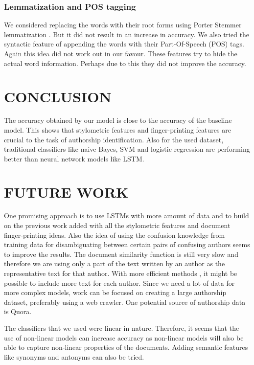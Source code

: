 \documentclass[letterpaper]{article}
\begin{document}
\subsubsection{Lemmatization and POS tagging}
We considered replacing the words with their root forms using Porter Stemmer lemmatization \cite{stem}. But it did not result in an increase in accuracy. We also tried the syntactic feature of appending the words with their Part-Of-Speech (POS) tags. Again this idea did not work out in our favour. These features try to hide the actual word information. Perhaps due to this they did not improve the accuracy.

\section{CONCLUSION}
The accuracy obtained by our model is close to the accuracy of the baseline model. This shows that stylometric features and finger-printing features are crucial to the task of authorship identification. Also for the used dataset, traditional classifiers like naive Bayes, SVM and logistic regression are performing better than neural network models like LSTM.

\section{FUTURE WORK}
One promising approach is to use LSTMs with more amount of data and  to build on the previous work\cite{pandeycs671}\cite{jindaldeanonymizing} added with all the stylometric features and document finger-printing ideas. Also the idea of using the confusion knowledge from training data for disambiguating between certain pairs of confusing authors seems to improve the results. The document similarity function is still very slow and therefore we are using only a part of the text written by an author as the representative text for that author. With more efficient methods , it might be possible to include more text for each author. Since we need a lot of data for more complex models, work can be focused on creating a large authorship dataset, preferably using a web crawler. One potential source of authorship data is Quora.

The classifiers that we used were linear in nature. Therefore, it seems that the use of non-linear models can increase accuracy as non-linear models will also be able to capture non-linear properties of the documents. Adding semantic features like synonyms and antonyms can also be tried.



\bigskip


\medskip



% 
% 

\end{document}
